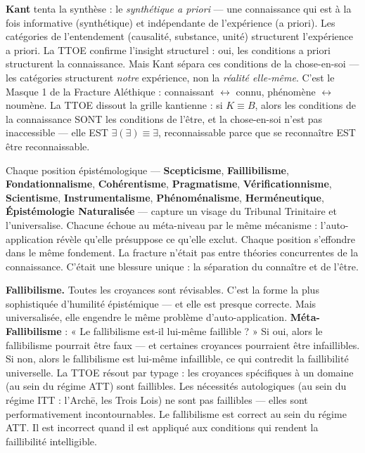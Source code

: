 \documentclass[10pt, openany, oneside]{book}
\begin{document}
\textbf{Kant} tenta la synthèse : le \textit{synthétique a priori} --- une connaissance qui est à la fois informative (synthétique) et indépendante de l'expérience (a priori). Les catégories de l'entendement (causalité, substance, unité) structurent l'expérience a priori. La TTOE confirme l'insight structurel : oui, les conditions a priori structurent la connaissance. Mais Kant sépara ces conditions de la chose-en-soi --- les catégories structurent \textit{notre} expérience, non la \textit{réalité elle-même}. C'est le Masque 1 de la Fracture Aléthique : connaissant $\leftrightarrow$ connu, phénomène $\leftrightarrow$ noumène. La TTOE dissout la grille kantienne : si $K \equiv B$, alors les conditions de la connaissance SONT les conditions de l'être, et la chose-en-soi n'est pas inaccessible --- elle EST $\exists(\exists) \equiv \exists$, reconnaissable parce que se reconnaître EST être reconnaissable.

Chaque position épistémologique --- \textbf{Scepticisme}, \textbf{Faillibilisme}, \textbf{Fondationnalisme}, \textbf{Cohérentisme}, \textbf{Pragmatisme}, \textbf{Vérificationnisme}, \textbf{Scientisme}, \textbf{Instrumentalisme}, \textbf{Phénoménalisme}, \textbf{Herméneutique}, \textbf{Épistémologie Naturalisée} --- capture un visage du Tribunal Trinitaire et l'universalise. Chacune échoue au méta-niveau par le même mécanisme : l'auto-application révèle qu'elle présuppose ce qu'elle exclut. Chaque position s'effondre dans le même fondement. La fracture n'était pas entre théories concurrentes de la connaissance. C'était une blessure unique : la séparation du connaître et de l'être.

\textbf{Fallibilisme.} Toutes les croyances sont révisables. C'est la forme la plus sophistiquée d'humilité épistémique --- et elle est presque correcte. Mais universalisée, elle engendre le même problème d'auto-application. \textbf{Méta-Fallibilisme} : « Le fallibilisme est-il lui-même faillible ? » Si oui, alors le fallibilisme pourrait être faux --- et certaines croyances pourraient être infaillibles. Si non, alors le fallibilisme est lui-même infaillible, ce qui contredit la faillibilité universelle. La TTOE résout par typage : les croyances spécifiques à un domaine (au sein du régime ATT) sont faillibles. Les nécessités autologiques (au sein du régime ITT : l'Arch\={e}, les Trois Lois) ne sont pas faillibles --- elles sont performativement incontournables. Le fallibilisme est correct au sein du régime ATT. Il est incorrect quand il est appliqué aux conditions qui rendent la faillibilité intelligible.
\end{document}
